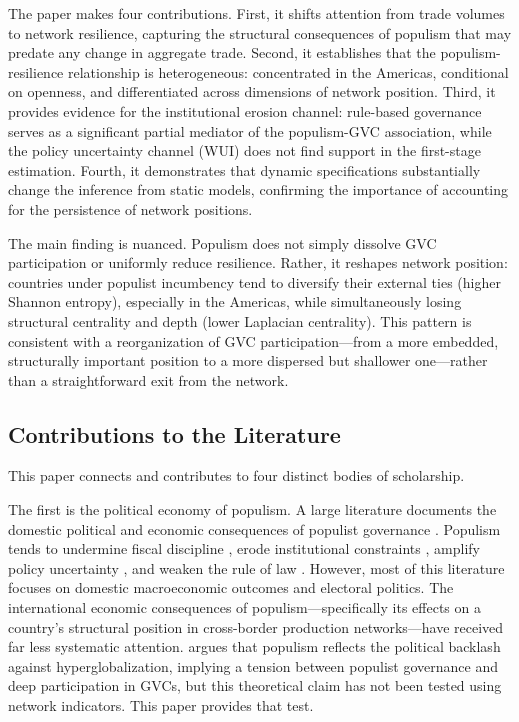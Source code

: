 \documentclass[12pt]{article}
\begin{document}
The paper makes four contributions. First, it shifts attention from trade volumes to network resilience, capturing the structural consequences of populism that may predate any change in aggregate trade. Second, it establishes that the populism-resilience relationship is heterogeneous: concentrated in the Americas, conditional on openness, and differentiated across dimensions of network position. Third, it provides evidence for the institutional erosion channel: rule-based governance serves as a significant partial mediator of the populism-GVC association, while the policy uncertainty channel (WUI) does not find support in the first-stage estimation. Fourth, it demonstrates that dynamic specifications substantially change the inference from static models, confirming the importance of accounting for the persistence of network positions.

The main finding is nuanced. Populism does not simply dissolve GVC participation or uniformly reduce resilience. Rather, it reshapes network position: countries under populist incumbency tend to diversify their external ties (higher Shannon entropy), especially in the Americas, while simultaneously losing structural centrality and depth (lower Laplacian centrality). This pattern is consistent with a reorganization of GVC participation---from a more embedded, structurally important position to a more dispersed but shallower one---rather than a straightforward exit from the network.

\subsection*{Contributions to the Literature}

This paper connects and contributes to four distinct bodies of scholarship.

The first is the political economy of populism. A large literature documents the domestic political and economic consequences of populist governance \citep{guriev2022, funke2020, dornbusch1991}. Populism tends to undermine fiscal discipline \citep{funke2016}, erode institutional constraints \citep{bermeo2016, levitskyloxton2013}, amplify policy uncertainty \citep{baker2016, julio2012}, and weaken the rule of law \citep{north1990, acemoglu2001}. However, most of this literature focuses on domestic macroeconomic outcomes and electoral politics. The international economic consequences of populism---specifically its effects on a country's structural position in cross-border production networks---have received far less systematic attention. \citet{rodrik2018} argues that populism reflects the political backlash against hyperglobalization, implying a tension between populist governance and deep participation in GVCs, but this theoretical claim has not been tested using network indicators. This paper provides that test.
\end{document}
